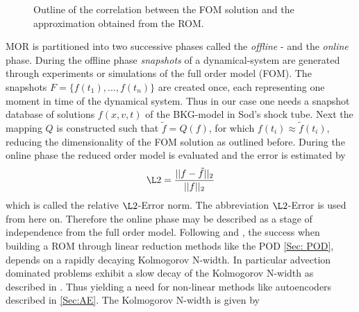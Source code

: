 \begin{figure}[H]
	\begin{subfigure}{.45\textwidth}
		\centering
		
	\end{subfigure}\hfill
	\begin{subfigure}{.45\textwidth}
		\centering
		
	\end{subfigure}
	\caption{Outline of the correlation between the FOM solution and the approximation obtained from the ROM.}
\end{figure}
MOR is partitioned into two successive phases called the \textit{offline} - and the \textit{online} phase. During the offline phase \textit{snapshots} of a dynamical-system are generated through experiments or simulations of the full order model (FOM). The snapshots \(F = \{f(t_1),...,f(t_n)\}\) are created once, each representing one moment in time of the dynamical system. Thus in our case one needs a snapshot database of solutions \(f(x,v,t)\) of the BKG-model in Sod's shock tube. Next the mapping \(Q\) is constructed such that \(\tilde{f} = Q(f)\), for which \(f(t_i) \approx \tilde{f}(t_i)\), reducing the dimensionality of the FOM solution as outlined before. During the online phase the reduced order model is evaluated and the error is estimated by 
\begin{equation}
	\L2 = \frac{||f - \tilde{f} ||_2}{||f||_2}
\end{equation}
which is called the relative \(\L2\)-Error norm. The abbreviation \(\L2\)-Error is used from here on. Therefore the online phase may be described as a stage of independence from the full order model.
Following \cite{ohlberger2015reduced} and \cite{Carlberg}, the success when building a ROM through linear reduction methods like the POD \cref{Sec: POD}, depends on a rapidly decaying Kolmogorov N-width. In particular advection dominated problems exhibit a slow decay of the Kolmogorov N-width as described in \cite{ohlberger2015reduced}. Thus yielding a need for non-linear methods like autoencoders described in \cref{Sec:AE}. The Kolmogorov N-width is given by
